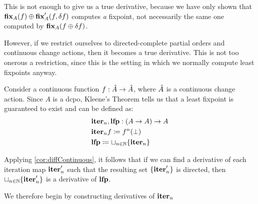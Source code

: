 This is not enough to give us a true derivative, because we have only shown 
that $\textbf{fix}_A(f) \oplus \textbf{fix}_A'(f, \delta f)$ computes \emph{a} fixpoint, not necessarily
the same one computed by $\textbf{fix}_A{(f \oplus \delta f)}$.

However, if we restrict ourselves to directed-complete partial orders and
continuous change actions, then it becomes a true derivative. This is not too
onerous a restriction, since this is the setting in which we normally compute
least fixpoints anyway.

Consider a continuous function $f : \hat{A} \rightarrow \hat{A}$, where $\hat{A}$ is a continuous change action. Since $A$
is a dcpo, Kleene's Theorem tells us that a least fixpoint is guaranteed to exist and can be defined as:
\begin{align*} 
  &\textbf{iter}_n, \textbf{lfp} : (A \rightarrow A) \rightarrow A\\
  &\textbf{iter}_n f \coloneqq f^n(\bot)\\
  &\textbf{lfp} \coloneqq \sqcup_{n \in \mathbb{N}} \{ \textbf{iter}_n \}
\end{align*}

Applying \cref{cor:diffContinuous}, it follows that if we can find a derivative of each iteration map $\textbf{iter}_n'$ such that the resulting 
set $\{ \textbf{iter}_n' \}$ is directed, then $\sqcup_{n \in \mathbb{N}}
\{\textbf{iter}_n' \}$ is a derivative of $\textbf{lfp}$.

We therefore begin by constructing derivatives of $\textbf{iter}_n$

